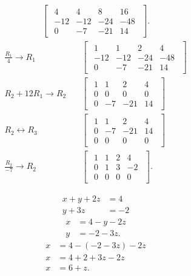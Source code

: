 \documentclass{zc-ust-hw}
\begin{document}
\begin{align}
  \begin{bmatrix} 
    \begin{array}{ccc|c}
      4 & 4 & 8 & 16 \\
      -12 & -12 & -24 & -48 \\
      0 & -7 & -21 & 14
    \end{array}
  \end{bmatrix}
.\end{align}
\begin{align}
  \frac{R_1}{4}\rightarrow R_1
  & \quad
  \begin{bmatrix} 
    \begin{array}{ccc|c}
      1 & 1 & 2 & 4 \\
      -12 & -12 & -24 & -48 \\
      0 & -7 & -21 & 14
    \end{array}
  \end{bmatrix} \\
  R_2+12R_1\rightarrow R_2
  & \quad
  \begin{bmatrix} 
    \begin{array}{ccc|c}
      1 & 1 & 2 & 4 \\
      0 & 0 & 0 & 0 \\
      0 & -7 & -21 & 14
    \end{array}
  \end{bmatrix} \\
  R_2 \leftrightarrow R_3
  & \quad
  \begin{bmatrix} 
    \begin{array}{ccc|c}
      1 & 1 & 2 & 4 \\
      0 & -7 & -21 & 14 \\
      0 & 0 & 0 & 0
    \end{array}
  \end{bmatrix} \\
  \frac{R_2}{-7}\rightarrow R_2
  & \quad
  \begin{bmatrix} 
    \begin{array}{ccc|c}
      1 & 1 & 2 & 4 \\
      0 & 1 & 3 & -2 \\
      0 & 0 & 0 & 0
    \end{array}
  \end{bmatrix}
.\end{align}

\begin{align}
  x + y + 2z &= 4 \\
  y + 3z &= -2
\end{align}
\begin{align}
  x &= 4 - y - 2z \\
  y &= -2 - 3z
.\end{align}
\begin{align}
  x &= 4 - (-2 - 3z) - 2z \\
  x &= 4 + 2 + 3z - 2z \\
  x &= 6 + z
.\end{align}
\end{document}
